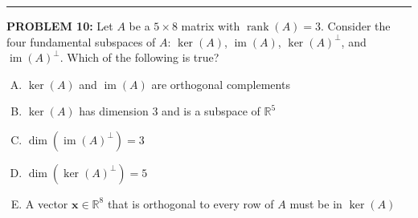 \documentclass[12pt]{amsart}
\newcommand{\divider}{
  \vspace{-1em} %
  \noindent
  \raisebox{-0.15ex}{\textbullet}%
  \hspace{0.5em}%
  \rule[0.5ex]{0.95\textwidth}{1.0pt}%
  \hspace{0.5em}%
  \raisebox{-0.15ex}{\textbullet}%
  \vspace{0em} %
}
\begin{document}
\divider


{\bf PROBLEM 10:}
%
Let $A$ be a $5 \times 8$ matrix with $\operatorname{rank}(A) = 3$. Consider the four fundamental subspaces of $A$: $\ker(A)$, $\operatorname{im}(A)$, $\ker(A)^\perp$, and $\operatorname{im}(A)^\perp$. Which of the following is true?

\begin{enumerate}[(A)]
\item $\ker(A)$ and $\operatorname{im}(A)$ are orthogonal complements
\item $\ker(A)$ has dimension $3$ and is a subspace of $\mathbb{R}^5$
\item $\dim(\operatorname{im}(A)^\perp) = 3$
\item $\dim(\ker(A)^\perp) = 5$
\item A vector $\mathbf{x} \in \mathbb{R}^8$ that is orthogonal to every row of $A$ must be in $\ker(A)$
\end{enumerate}
\end{document}
